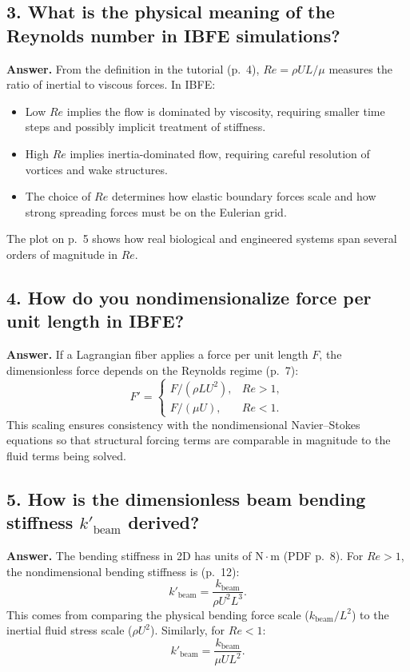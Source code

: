 \documentclass[12pt]{article}
\begin{document}
\subsection*{3. What is the physical meaning of the Reynolds number in IBFE simulations?}

\textbf{Answer.}
From the definition in the tutorial (p.~4), $Re=\rho UL/\mu$ measures the ratio of
inertial to viscous forces.  
In IBFE:
\begin{itemize}
    \item Low $Re$ implies the flow is dominated by viscosity, requiring smaller 
          time steps and possibly implicit treatment of stiffness.
    \item High $Re$ implies inertia-dominated flow, requiring careful resolution
          of vortices and wake structures.
    \item The choice of $Re$ determines how elastic boundary forces scale and how
          strong spreading forces must be on the Eulerian grid.
\end{itemize}
The plot on p.~5 shows how real biological and engineered systems span several
orders of magnitude in $Re$.
\subsection*{4. How do you nondimensionalize force per unit length in IBFE?}

\textbf{Answer.}
If a Lagrangian fiber applies a force per unit length $F$, the dimensionless force
depends on the Reynolds regime (p.~7):
\[
F' = 
\begin{cases}
F / (\rho L U^2), & Re>1,\\[6pt]
F / (\mu U), & Re<1.
\end{cases}
\]
This scaling ensures consistency with the nondimensional Navier--Stokes
equations so that structural forcing terms are comparable in magnitude to the
fluid terms being solved.

\subsection*{5. How is the dimensionless beam bending stiffness $k'_{\text{beam}}$ derived?}

\textbf{Answer.}
The bending stiffness in 2D has units of $\mathrm{N\cdot m}$ (PDF p.~8).
For $Re>1$, the nondimensional bending stiffness is (p.~12):
\[
k'_{\text{beam}}=\frac{k_{\text{beam}}}{\rho U^2 L^3}.
\]
This comes from comparing the physical bending force scale
($k_{\text{beam}}/L^2$) to the inertial fluid stress scale
($\rho U^2$).  
Similarly, for $Re<1$:
\[
k'_{\text{beam}}=\frac{k_{\text{beam}}}{\mu U L^2}.
\]
\end{document}
